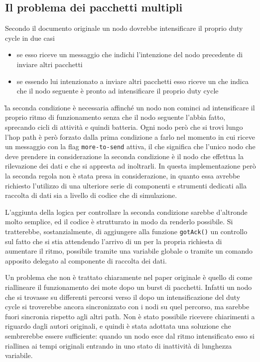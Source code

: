 \documentclass[twoside,11pt,a4paper,italian,openany]{book}
\begin{document}
\subsection{Il problema dei pacchetti multipli}
Secondo il documento originale un nodo dovrebbe intensificare il proprio duty cycle in due casi
\begin{itemize}
\item{se esso riceve un messaggio che indichi l'intenzione del nodo precedente di inviare altri 
pacchetti}
\item{se essendo lui intenzionato a inviare altri pacchetti esso riceve un \ack che indica che il nodo seguente è pronto ad intensificare il proprio duty cycle}
\end{itemize}
\`la seconda condizione è necessaria affinché un nodo non cominci ad intensificare il proprio 
ritmo di funzionamento senza che il nodo seguente l'abbia fatto, sprecando cicli di attività e 
quindi batteria. Ogni nodo però che si trovi lungo l'hop path è però forzato dalla prima 
condizione a farlo nel momento in cui riceve un messaggio con la flag \texttt{more-to-send} 
attiva, il che significa che l'unico nodo che deve prendere in considerazione la seconda 
condizione è il nodo che effettua la rilevazione dei dati e che si appresta ad inoltrarli. 
In questa implementazione però la seconda regola non è stata presa in considerazione, in quanto 
essa avrebbe richiesto l'utilizzo di una ulteriore serie di componenti e strumenti dedicati alla 
raccolta di dati sia a livello di codice che di simulazione.

L'aggiunta della logica per controllare la seconda condizione sarebbe d'altronde molto 
semplice, ed il codice è strutturato in modo da renderlo possibile.
Si tratterebbe, sostanzialmente, di aggiungere alla funzione \texttt{gotAck()} un controllo sul 
fatto che si stia attendendo l'arrivo di un \ack per la propria richiesta di aumentare il ritmo,
possibile tramite una variabile globale o tramite un comando apposito delegato al componente di 
raccolta dei dati.  

Un problema che non è trattato chiaramente nel paper originale\cite{DMAC} è quello di come 
riallineare il funzionamento dei mote dopo un burst di pacchetti. 
Infatti un nodo che si trovasse su differenti percorsi verso il \sink dopo un intensificazione 
del duty cycle si troverebbe ancora sincronizzato con i nodi su quel percorso, ma sarebbe 
fuori sincronia rispetto agli altri path. 
Non è stato possibile ricevere chiarimenti a riguardo dagli autori originali, e quindi è stata 
adottata una soluzione che sembrerebbe essere sufficiente: quando un nodo esce dal ritmo 
intensificato esso si riallinea ai tempi originali entrando in uno stato di inattività di 
lunghezza variabile.
 
\end{document}
